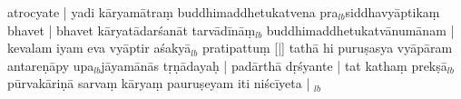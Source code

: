 \documentclass[article,12pt,a4paper]{memoir}%
\newcounter{parCount}
\begin{document}
	  
	  \pstart \leavevmode%
	atrocyate | yadi kāryamātraṃ buddhimaddhetukatvena pra{\tiny $_{lb}$}siddhavyāptikaṃ bhavet | bhavet kāryatādarśanāt tarvādīnāṃ{\tiny $_{lb}$} buddhimaddhetukatvānumānam | kevalam iyam eva vyāptir aśakyā{\tiny $_{lb}$} pratipattuṃ [|] tathā hi puruṣasya vyāpāram antareṇāpy upa{\tiny $_{lb}$}jāyamānās tṛṇādayaḥ | padārthā dṛśyante | tat kathaṃ prekṣā{\tiny $_{lb}$}pūrvakāriṇā sarvaṃ kāryaṃ pauruṣeyam iti niścīyeta |
	{}
	\pend%
      {\tiny $_{lb}$}
\end{document}
